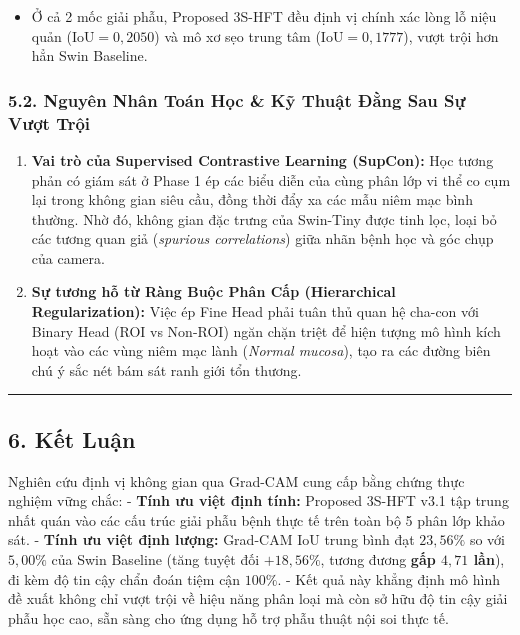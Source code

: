 \documentclass[
  11pt,
  a4paper,
]{article}
\providecommand{\tightlist}{%
  \setlength{\itemsep}{0pt}\setlength{\parskip}{0pt}}
\begin{document}
\begin{enumerate}
  \begin{itemize}
  \tightlist
  \item
    Ở cả 2 mốc giải phẫu, Proposed 3S-HFT đều định vị chính xác lòng lỗ
    niệu quản (\(\text{IoU} = 0{,}2050\)) và mô xơ sẹo trung tâm
    (\(\text{IoU} = 0{,}1777\)), vượt trội hơn hẳn Swin Baseline.
  \end{itemize}
\end{enumerate}

\subsubsection{5.2. Nguyên Nhân Toán Học \& Kỹ Thuật Đằng Sau Sự Vượt
Trội}\label{nguyuxean-nhuxe2n-touxe1n-hux1ecdc-kux1ef9-thuux1eadt-ux111ux1eb1ng-sau-sux1ef1-vux1b0ux1ee3t-trux1ed9i}

\begin{enumerate}
\def\labelenumi{\arabic{enumi}.}
\tightlist
\item
  \textbf{Vai trò của Supervised Contrastive Learning (SupCon):} Học
  tương phản có giám sát ở Phase 1 ép các biểu diễn của cùng phân lớp vi
  thể co cụm lại trong không gian siêu cầu, đồng thời đẩy xa các mẫu
  niêm mạc bình thường. Nhờ đó, không gian đặc trưng của Swin-Tiny được
  tinh lọc, loại bỏ các tương quan giả (\emph{spurious correlations})
  giữa nhãn bệnh học và góc chụp của camera.
\item
  \textbf{Sự tương hỗ từ Ràng Buộc Phân Cấp (Hierarchical
  Regularization):} Việc ép Fine Head phải tuân thủ quan hệ cha-con với
  Binary Head (ROI vs Non-ROI) ngăn chặn triệt để hiện tượng mô hình
  kích hoạt vào các vùng niêm mạc lành (\emph{Normal mucosa}), tạo ra
  các đường biên chú ý sắc nét bám sát ranh giới tổn thương.
\end{enumerate}

\begin{center}\rule{0.5\linewidth}{0.5pt}\end{center}

\subsection{6. Kết Luận}\label{kux1ebft-luux1eadn}

Nghiên cứu định vị không gian qua Grad-CAM cung cấp bằng chứng thực
nghiệm vững chắc: - \textbf{Tính ưu việt định tính:} Proposed 3S-HFT
v3.1 tập trung nhất quán vào các cấu trúc giải phẫu bệnh thực tế trên
toàn bộ 5 phân lớp khảo sát. - \textbf{Tính ưu việt định lượng:}
Grad-CAM IoU trung bình đạt \textbf{\(23{,}56\%\)} so với
\textbf{\(5{,}00\%\)} của Swin Baseline (tăng tuyệt đối
\textbf{\(+18{,}56\%\)}, tương đương \textbf{gấp \(4{,}71\) lần}), đi
kèm độ tin cậy chẩn đoán tiệm cận \(100\%\). - Kết quả này khẳng định mô
hình đề xuất không chỉ vượt trội về hiệu năng phân loại mà còn sở hữu độ
tin cậy giải phẫu học cao, sẵn sàng cho ứng dụng hỗ trợ phẫu thuật nội
soi thực tế.
\end{document}
